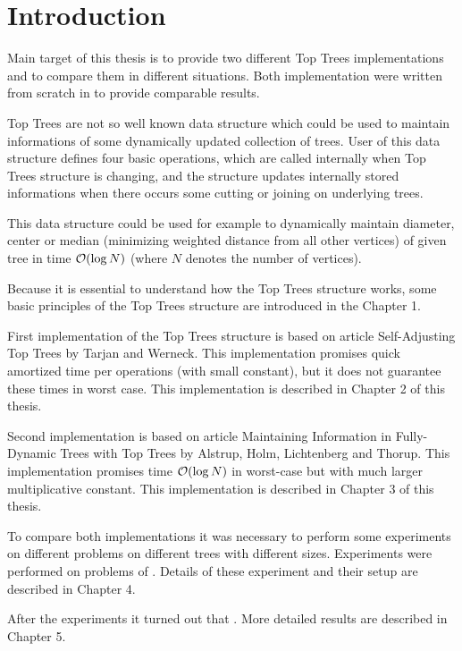 \chapter*{Introduction}

Main target of this thesis is to provide two different {\I Top Trees}
implementations and to compare them in different situations. Both implementation
were written from scratch in \Cpp{} to provide comparable results.

{\I Top Trees} are not so well known data structure which could be used to
maintain informations of some dynamically updated collection of trees. User of
this data structure defines four basic operations, which are called internally
when Top Trees structure is changing, and the structure updates internally
stored informations when there occurs some cutting or joining on underlying
trees.

This data structure could be used for example to dynamically maintain diameter,
center or median (minimizing weighted distance from all other vertices) of given
tree in time ${\cal O}(\log N)$ (where $N$ denotes the number of vertices).

Because it is essential to understand how the Top Trees structure works, some
basic principles of the Top Trees structure are introduced in the Chapter 1.

First implementation of the Top Trees structure is based on article {\I
Self-Adjusting Top Trees} \cite{SelfAdjustingTT} by Tarjan and Werneck. This
implementation promises quick amortized time per operations (with small
constant), but it does not guarantee these times in worst case. This
implementation is described in Chapter 2 of this thesis.

Second implementation is based on article {\I Maintaining Information in
Fully-Dynamic Trees with Top Trees} \cite{TopTrees} by Alstrup, Holm,
Lichtenberg and Thorup. This implementation promises time ${\cal O}(\log N)$ in
worst-case but with much larger multiplicative constant. This implementation is
described in Chapter 3 of this thesis.

To compare both implementations it was necessary to perform some experiments on
different problems on different trees with different sizes. Experiments were
performed on problems of . Details of these experiment
and their setup are described in Chapter 4.

After the experiments it turned out that
.
More detailed results are described in Chapter 5.

